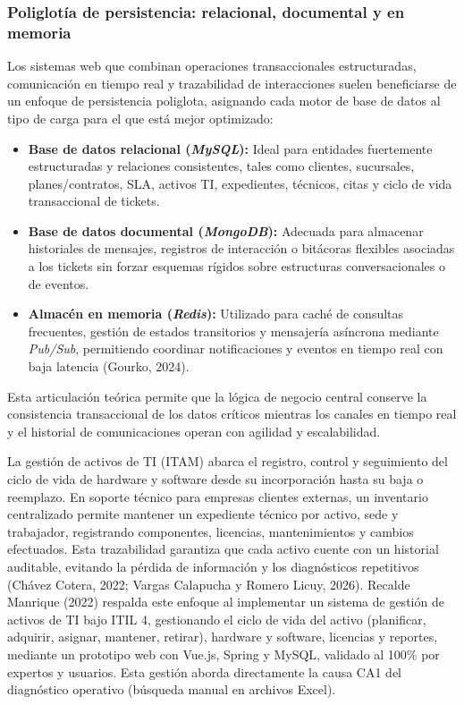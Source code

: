 \subsubsection{Poliglotía de persistencia: relacional, documental y en memoria}
Los sistemas web que combinan operaciones transaccionales estructuradas, comunicación en tiempo real y trazabilidad de interacciones suelen beneficiarse de un enfoque de persistencia poliglota, asignando cada motor de base de datos al tipo de carga para el que está mejor optimizado:

\begin{itemize}[leftmargin=1.27cm]
 \item \textbf{Base de datos relacional (\textit{MySQL}):} Ideal para entidades fuertemente estructuradas y relaciones consistentes, tales como clientes, sucursales, planes/contratos, SLA, activos TI, expedientes, técnicos, citas y ciclo de vida transaccional de tickets.
 
 \item \textbf{Base de datos documental (\textit{MongoDB}):} Adecuada para almacenar historiales de mensajes, registros de interacción o bitácoras flexibles asociadas a los tickets sin forzar esquemas rígidos sobre estructuras conversacionales o de eventos.
 
 \item \textbf{Almacén en memoria (\textit{Redis}):} Utilizado para caché de consultas frecuentes, gestión de estados transitorios y mensajería asíncrona mediante \textit{Pub/Sub}, permitiendo coordinar notificaciones y eventos en tiempo real con baja latencia (Gourko, 2024).
\end{itemize}

Esta articulación teórica permite que la lógica de negocio central conserve la consistencia transaccional de los datos críticos mientras los canales en tiempo real y el historial de comunicaciones operan con agilidad y escalabilidad.

\vspace{0.6em}

La gestión de activos de TI (ITAM) abarca el registro, control y seguimiento del ciclo de vida de hardware y software desde su incorporación hasta su baja o reemplazo. En soporte técnico para empresas clientes externas, un inventario centralizado permite mantener un expediente técnico por activo, sede y trabajador, registrando componentes, licencias, mantenimientos y cambios efectuados. Esta trazabilidad garantiza que cada activo cuente con un historial auditable, evitando la pérdida de información y los diagnósticos repetitivos (Chávez Cotera, 2022; Vargas Calapucha y Romero Licuy, 2026). Recalde Manrique (2022) respalda este enfoque al implementar un sistema de gestión de activos de TI bajo ITIL 4, gestionando el ciclo de vida del activo (planificar, adquirir, asignar, mantener, retirar), hardware y software, licencias y reportes, mediante un prototipo web con Vue.js, Spring y MySQL, validado al 100\% por expertos y usuarios. Esta gestión aborda directamente la causa CA1 del diagnóstico operativo (búsqueda manual en archivos Excel).

